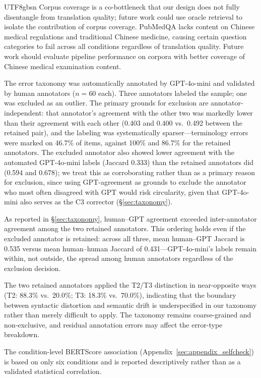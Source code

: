 \documentclass[11pt]{article}
\begin{document}
\begin{CJK}{UTF8}{gbsn}
Corpus coverage is a co-bottleneck that our design does not fully disentangle from translation quality; future work could use oracle retrieval to isolate the contribution of corpus coverage. PubMedQA lacks content on Chinese medical regulations and traditional Chinese medicine, causing certain question categories to fail across all conditions regardless of translation quality. Future work should evaluate pipeline performance on corpora with better coverage of Chinese medical examination content.

The error taxonomy was automatically annotated by GPT-4o-mini and validated by human annotators ($n = 60$ each). Three annotators labeled the sample; one was excluded as an outlier. The primary grounds for exclusion are annotator-independent: that annotator's agreement with the other two was markedly lower than their agreement with each other (0.403 and 0.400 vs.\ 0.492 between the retained pair), and the labeling was systematically sparser---terminology errors were marked on 46.7\% of items, against 100\% and 86.7\% for the retained annotators. The excluded annotator also showed lower agreement with the automated GPT-4o-mini labels (Jaccard 0.333) than the retained annotators did (0.594 and 0.678); we treat this as corroborating rather than as a primary reason for exclusion, since using GPT-agreement as grounds to exclude the annotator who most often disagreed with GPT would risk circularity, given that GPT-4o-mini also serves as the C3 corrector (\S\ref{sec:taxonomy}).

As reported in \S\ref{sec:taxonomy}, human--GPT agreement exceeded inter-annotator agreement among the two retained annotators. This ordering holds even if the excluded annotator is retained: across all three, mean human--GPT Jaccard is 0.535 versus mean human--human Jaccard of 0.431---GPT-4o-mini's labels remain within, not outside, the spread among human annotators regardless of the exclusion decision.

The two retained annotators applied the T2/T3 distinction in near-opposite ways (T2: 88.3\% vs.\ 20.0\%; T3: 18.3\% vs.\ 70.0\%), indicating that the boundary between syntactic distortion and semantic drift is underspecified in our taxonomy rather than merely difficult to apply. The taxonomy remains coarse-grained and non-exclusive, and residual annotation errors may affect the error-type breakdown.

The condition-level BERTScore association (Appendix~\ref{sec:appendix_selfcheck}) is based on only six conditions and is reported descriptively rather than as a validated statistical correlation.


\end{CJK}
\end{document}

